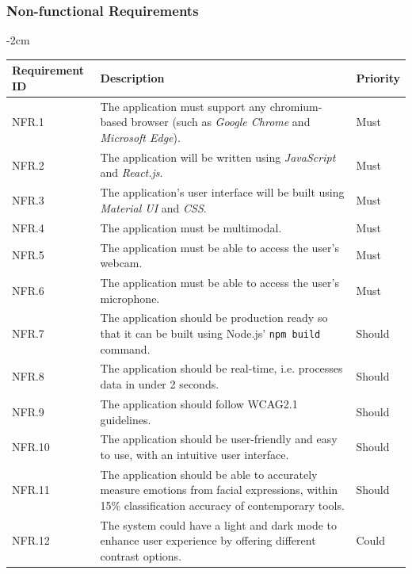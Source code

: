 \documentclass[12pt, a4paper]{article}
\begin{document}
\subsubsection{Non-functional Requirements}
\label{nfrs}
\begin{table}[H]
    \centering
    \addtolength{\leftskip} {-2cm}
    \addtolength{\rightskip}{-2cm}
    \begin{tabular}{|L{3.4cm}|L{8.9cm}|L{1.8cm}|}
        \hline
        \normalsize{\textbf{Requirement ID}} & \normalsize{\textbf{Description}} & \normalsize{\textbf{Priority}}
        \\ \hline

        NFR.1 & The application must support any chromium-based browser (such as \textit{Google Chrome} and \textit{Microsoft Edge}). & Must        
        \\ \hline
        NFR.2 & The application will be written using \textit{JavaScript} and \textit{React.js}. & Must
        \\ \hline
        NFR.3 & The application's user interface will be built using \textit{Material UI} and \textit{CSS}. & Must
        \\ \hline
        NFR.4 & The application must be multimodal. & Must
        \\ \hline
        NFR.5 & The application must be able to access the user's webcam. & Must
        \\ \hline
        NFR.6 & The application must be able to access the user's microphone. & Must 
        \\ \hline
        NFR.7 & The application should be production ready so that it can be built using Node.js' \verb+npm build+ command. & Should
        \\ \hline
        NFR.8 & The application should be real-time, i.e. processes data in under 2 seconds. & Should
        \\ \hline
        NFR.9 & The application should follow WCAG2.1 guidelines. & Should
        \\ \hline
        NFR.10 & The application should be user-friendly and easy to use, with an intuitive user interface. & Should
        \\ \hline
        NFR.11 & The application should be able to accurately measure emotions from facial expressions, within 15\% classification accuracy of contemporary tools. & Should
        \\ \hline
        NFR.12 & The system could have a light and dark mode to enhance user experience by offering different contrast options. & Could

\end{tabular}
\end{table}
\end{document}
